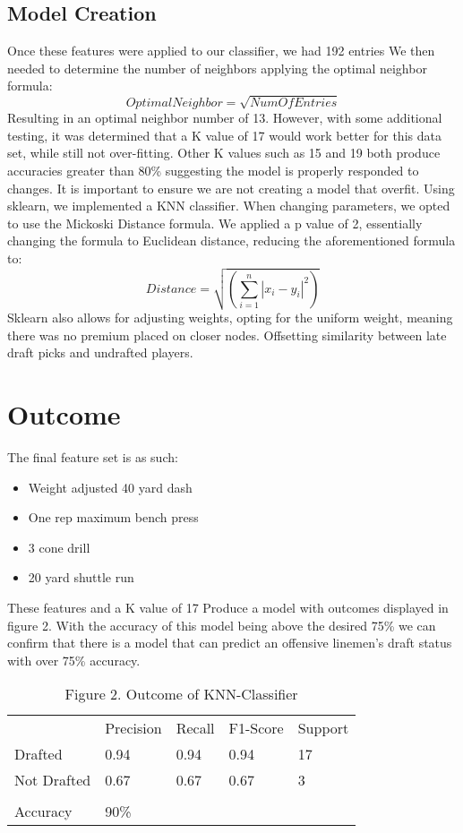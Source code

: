 \documentclass[confrence]{IEEEtran}
\begin{document}
\subsection*{Model Creation}
Once these features were applied to our classifier, we had 192 entries
We then needed to determine the number of neighbors applying the optimal neighbor formula: \[OptimalNeighbor = \sqrt{NumOfEntries}\]
Resulting in an optimal neighbor number of 13.
However, with some additional testing, it was determined that a K value of 17 would work better for this data set, while still not over-fitting.
Other K values such as 15 and 19 both produce accuracies greater than 80\% suggesting the model is properly responded to changes.
It is important to ensure we are not creating a model that overfit.
Using sklearn, we implemented a KNN classifier. When changing parameters, we opted to use the Mickoski Distance formula.
We applied a p value of 2, essentially changing the formula to Euclidean distance, reducing the aforementioned formula to:
\[Distance = \sqrt{(\sum_{i=1}^n|x_i-y_i|^2)}\]
Sklearn also allows for adjusting weights, opting for the uniform weight, meaning there was no premium placed on closer nodes.
Offsetting similarity between late draft picks and undrafted players.
\section*{Outcome}
The final feature set is as such:
\begin{itemize}
    \item Weight adjusted 40 yard dash
    \item One rep maximum bench press
    \item 3 cone drill
    \item 20 yard shuttle run
\end{itemize}
These features and a K value of 17 Produce a model with outcomes displayed in figure 2.
With the accuracy of this model being above the desired 75\% we can confirm that there is a model that can predict an offensive linemen's draft status with over 75\% accuracy.
\begin{table}[htbp]
\begin{tabular}{lllll}
            & Precision & Recall & F1-Score & Support \\
Drafted     & 0.94      & 0.94   & 0.94     & 17      \\
Not Drafted & 0.67      & 0.67   & 0.67     & 3       \\
            &           &        &          &         \\
Accuracy    & 90\%      &        &          &         \\
\end{tabular}
\caption{Figure 2. Outcome of KNN-Classifier}
\end{table}
\end{document}

